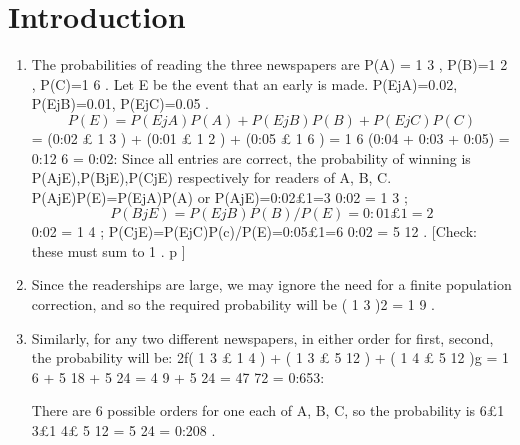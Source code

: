 \documentclass{article}
\begin{document}
\section{Introduction}
\begin{enumerate}

\item The probabilities of reading the three newspapers are
P(A) = 1
3 , P(B)=1
2 , P(C)=1
6 .
Let E be the event that an early is made.
P(EjA)=0.02, P(EjB)=0.01, P(EjC)=0.05 .
\[P(E) = P(EjA)P(A) + P(EjB)P(B) + P(EjC)P(C)\]
= (0:02 £ 1
3 ) + (0:01 £ 1
2 ) + (0:05 £ 1
6 )
= 1
6 (0:04 + 0:03 + 0:05)
= 0:12
6 = 0:02:
Since all entries are correct, the probability of winning is P(AjE),P(BjE),P(CjE) respectively for
readers of A, B, C.
P(AjE)P(E)=P(EjA)P(A) or P(AjE)=0:02£1=3
0:02 = 1
3 ;
\[P(BjE)=P(EjB)P(B)/P(E)=0:01£1=2\]
0:02 = 1
4 ;
P(CjE)=P(EjC)P(c)/P(E)=0:05£1=6
0:02 = 5
12 .
[Check: these must sum to 1 .
p
]

\item Since the readerships are large, we may ignore the need for a finite population correction, and
so the required probability will be ( 1
3 )2 = 1
9 .
\item Similarly, for any two different newspapers, in either order for first, second, the probability
will be: 2f( 1
3 £ 1
4 ) + ( 1
3 £ 5
12 ) + ( 1
4 £ 5
12 )g = 1
6 + 5
18 + 5
24 = 4
9 + 5
24 = 47
72 = 0:653:

There are 6 possible orders for one each of A, B, C, so the probability is 6£1
3£1
4£ 5
12 = 5
24 = 0:208 .
\end{enumerate}
\end{document}
